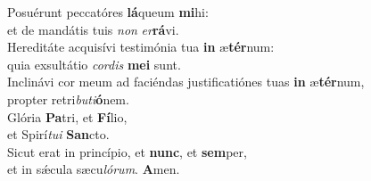 \evenverse Posuérunt peccatóres \textbf{lá}queum \textbf{mi}hi:~\*\\
\evenverse et de mandátis tuis \textit{non} \textit{er}\textbf{rá}vi.\\
\oddverse Hereditáte acquisívi testimónia tua \textbf{in} æ\textbf{tér}num:~\*\\
\oddverse quia exsultátio \textit{cor}\textit{dis} \textbf{me}\textbf{i} sunt.\\
\evenverse Inclinávi cor meum ad faciéndas justificatiónes tuas \textbf{in} æ\textbf{tér}num,~\*\\
\evenverse propter retri\textit{bu}\textit{ti}\textbf{ó}nem.\\
\oddverse Glória \textbf{Pa}tri, et \textbf{Fí}lio,~\*\\
\oddverse et Spirí\textit{tu}\textit{i} \textbf{San}cto.\\
\evenverse Sicut erat in princípio, et \textbf{nunc}, et \textbf{sem}per,~\*\\
\evenverse et in sǽcula sæcu\textit{ló}\textit{rum}. \textbf{A}men.\\

